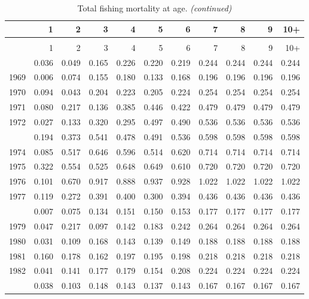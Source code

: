 \documentclass[
]{article}
\begin{document}
\begin{longtable}[t]{lrrrrrrrrrr}
\caption{\label{tab:FAA-tot-table}Total fishing mortality at age.}\\
\toprule
  & 1 & 2 & 3 & 4 & 5 & 6 & 7 & 8 & 9 & 10+\\
\midrule
\endfirsthead
\caption[]{Total fishing mortality at age. \textit{(continued)}}\\
\toprule
  & 1 & 2 & 3 & 4 & 5 & 6 & 7 & 8 & 9 & 10+\\
\midrule
\endhead

\endfoot
\bottomrule
\endlastfoot
1968 & 0.036 & 0.049 & 0.165 & 0.226 & 0.220 & 0.219 & 0.244 & 0.244 & 0.244 & 0.244\\
1969 & 0.006 & 0.074 & 0.155 & 0.180 & 0.133 & 0.168 & 0.196 & 0.196 & 0.196 & 0.196\\
1970 & 0.094 & 0.043 & 0.204 & 0.223 & 0.205 & 0.224 & 0.254 & 0.254 & 0.254 & 0.254\\
1971 & 0.080 & 0.217 & 0.136 & 0.385 & 0.446 & 0.422 & 0.479 & 0.479 & 0.479 & 0.479\\
1972 & 0.027 & 0.133 & 0.320 & 0.295 & 0.497 & 0.490 & 0.536 & 0.536 & 0.536 & 0.536\\
\addlinespace
1973 & 0.194 & 0.373 & 0.541 & 0.478 & 0.491 & 0.536 & 0.598 & 0.598 & 0.598 & 0.598\\
1974 & 0.085 & 0.517 & 0.646 & 0.596 & 0.514 & 0.620 & 0.714 & 0.714 & 0.714 & 0.714\\
1975 & 0.322 & 0.554 & 0.525 & 0.648 & 0.649 & 0.610 & 0.720 & 0.720 & 0.720 & 0.720\\
1976 & 0.101 & 0.670 & 0.917 & 0.888 & 0.937 & 0.928 & 1.022 & 1.022 & 1.022 & 1.022\\
1977 & 0.119 & 0.272 & 0.391 & 0.400 & 0.300 & 0.394 & 0.436 & 0.436 & 0.436 & 0.436\\
\addlinespace
1978 & 0.007 & 0.075 & 0.134 & 0.151 & 0.150 & 0.153 & 0.177 & 0.177 & 0.177 & 0.177\\
1979 & 0.047 & 0.217 & 0.097 & 0.142 & 0.183 & 0.242 & 0.264 & 0.264 & 0.264 & 0.264\\
1980 & 0.031 & 0.109 & 0.168 & 0.143 & 0.139 & 0.149 & 0.188 & 0.188 & 0.188 & 0.188\\
1981 & 0.160 & 0.178 & 0.162 & 0.197 & 0.195 & 0.198 & 0.218 & 0.218 & 0.218 & 0.218\\
1982 & 0.041 & 0.141 & 0.177 & 0.179 & 0.154 & 0.208 & 0.224 & 0.224 & 0.224 & 0.224\\
\addlinespace
1983 & 0.038 & 0.103 & 0.148 & 0.143 & 0.137 & 0.143 & 0.167 & 0.167 & 0.167 & 0.167\\

\end{longtable}
\end{document}
